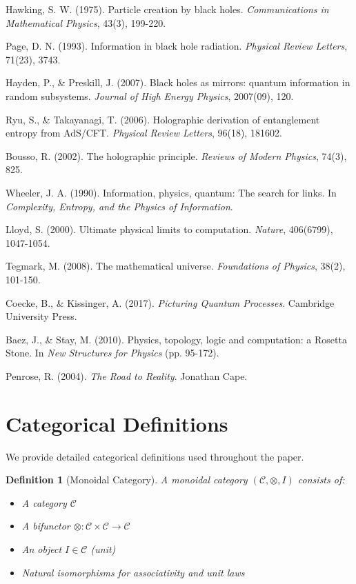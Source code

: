 \documentclass[12pt]{article}
\newtheorem{definition}[theorem]{Definition}
\begin{document}
\begin{thebibliography}{99}
Hawking, S. W. (1975). 
Particle creation by black holes. 
\emph{Communications in Mathematical Physics}, 43(3), 199-220.

Page, D. N. (1993). 
Information in black hole radiation. 
\emph{Physical Review Letters}, 71(23), 3743.

Hayden, P., \& Preskill, J. (2007). 
Black holes as mirrors: quantum information in random subsystems. 
\emph{Journal of High Energy Physics}, 2007(09), 120.

Ryu, S., \& Takayanagi, T. (2006). 
Holographic derivation of entanglement entropy from AdS/CFT. 
\emph{Physical Review Letters}, 96(18), 181602.

Bousso, R. (2002). 
The holographic principle. 
\emph{Reviews of Modern Physics}, 74(3), 825.

Wheeler, J. A. (1990). 
Information, physics, quantum: The search for links. 
In \emph{Complexity, Entropy, and the Physics of Information}.

Lloyd, S. (2000). 
Ultimate physical limits to computation. 
\emph{Nature}, 406(6799), 1047-1054.

Tegmark, M. (2008). 
The mathematical universe. 
\emph{Foundations of Physics}, 38(2), 101-150.

Coecke, B., \& Kissinger, A. (2017). 
\emph{Picturing Quantum Processes}. 
Cambridge University Press.

Baez, J., \& Stay, M. (2010). 
Physics, topology, logic and computation: a Rosetta Stone. 
In \emph{New Structures for Physics} (pp. 95-172).

Penrose, R. (2004). 
\emph{The Road to Reality}. 
Jonathan Cape.

\end{thebibliography}

\appendix

\section{Categorical Definitions}

We provide detailed categorical definitions used throughout the paper.

\begin{definition}[Monoidal Category]
A monoidal category $(\mathcal{C}, \otimes, I)$ consists of:
\begin{itemize}
\item A category $\mathcal{C}$
\item A bifunctor $\otimes: \mathcal{C} \times \mathcal{C} \to \mathcal{C}$
\item An object $I \in \mathcal{C}$ (unit)
\item Natural isomorphisms for associativity and unit laws
\end{itemize}
\end{definition}
\end{document}
